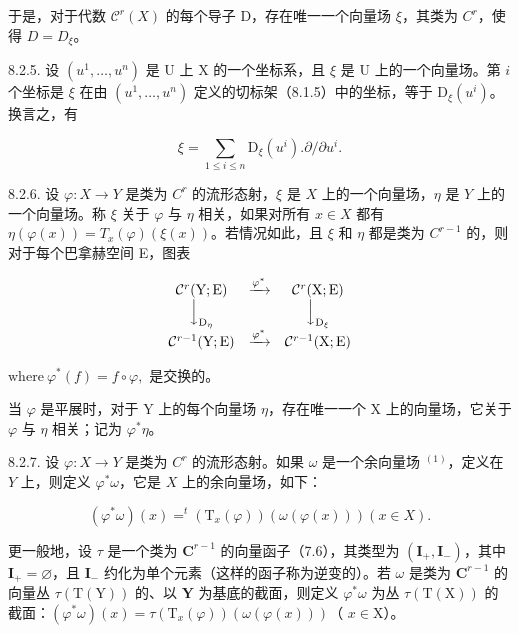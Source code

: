 于是，对于代数 \(\mathcal{C}^r(X)\) 的每个导子 D，存在唯一一个向量场 \(\xi\)，其类为 \(C^r\)，使得 \(D = D_{\xi}\)。

8.2.5. 设 \((u^{1},\ldots ,u^{n})\) 是 U 上 X 的一个坐标系，且 \(\xi\) 是 U 上的一个向量场。第 \(i\) 个坐标是 \(\xi\) 在由 \((u^{1},\ldots ,u^{n})\) 定义的切标架（8.1.5）中的坐标，等于 \(\mathrm{D}_{\xi}(u^i)\)。换言之，有

\[
\xi = \sum_ {1 \leqslant i \leqslant n} \mathrm{D} _ {\xi} (u ^ {i}). \partial / \partial u ^ {i}.
\]

8.2.6. 设 \(\varphi: X \to Y\) 是类为 \(C^r\) 的流形态射，\(\xi\) 是 \(X\) 上的一个向量场，\(\eta\) 是 \(Y\) 上的一个向量场。称 \(\xi\) 关于 \(\varphi\) 与 \(\eta\) 相关，如果对所有 \(x \in X\) 都有 \(\eta(\varphi(x)) = T_x(\varphi)(\xi(x))\)。若情况如此，且 \(\xi\) 和 \(\eta\) 都是类为 \(C^{r-1}\) 的，则对于每个巴拿赫空间 E，图表

\[
\begin{array}{c c c} \mathcal {C} ^ {r} (\mathrm{Y}; \mathrm{E}) & \xrightarrow {\varphi^ {*}} & \mathcal {C} ^ {r} (\mathrm{X}; \mathrm{E}) \\ \Big \downarrow_ {\mathrm{D} _ {\eta}} & & \Big \downarrow_ {\mathrm{D} _ {\xi}} \\ \mathcal {C} ^ {r - 1} (\mathrm{Y}; \mathrm{E}) & \xrightarrow {\varphi^ {*}} & \mathcal {C} ^ {r - 1} (\mathrm{X}; \mathrm{E}) \end{array}
\]

\(\mathrm{where}\ \varphi^{*}(f) = f\circ \varphi ,\) 是交换的。

当 \(\varphi\) 是平展时，对于 Y 上的每个向量场 \(\eta\)，存在唯一一个 X 上的向量场，它关于 \(\varphi\) 与 \(\eta\) 相关；记为 \(\varphi^{*}\eta\)。

8.2.7. 设 \(\varphi: X \to Y\) 是类为 \(C^r\) 的流形态射。如果 \(\omega\) 是一个余向量场 \(^{(1)}\)，定义在 \(Y\) 上，则定义 \(\varphi^*\omega\)，它是 \(X\) 上的余向量场，如下：

\[
(\varphi^ {*} \omega) (x) = ^ {t} (\mathrm{T} _ {x} (\varphi)) (\omega (\varphi (x))) (x \in X).
\]

更一般地，设 \(\tau\) 是一个类为 \(\mathbf{C}^{r-1}\) 的向量函子（7.6），其类型为 \((\mathbf{I}_{+}, \mathbf{I}_{-})\)，其中 \(\mathbf{I}_{+} = \varnothing\)，且 \(\mathbf{I}_{-}\) 约化为单个元素（这样的函子称为逆变的）。若 \(\omega\) 是类为 \(\mathbf{C}^{r-1}\) 的向量丛 \(\tau(\mathrm{T}(\mathrm{Y}))\) 的、以 \(\mathbf{Y}\) 为基底的截面，则定义 \(\varphi^{*}\omega\) 为丛 \(\tau(\mathrm{T}(\mathrm{X}))\) 的截面：\((\varphi^{*}\omega)(x) = \tau(\mathrm{T}_{x}(\varphi))(\omega(\varphi(x)))\)（ \(x \in \mathrm{X}\)）。
\relax{}

